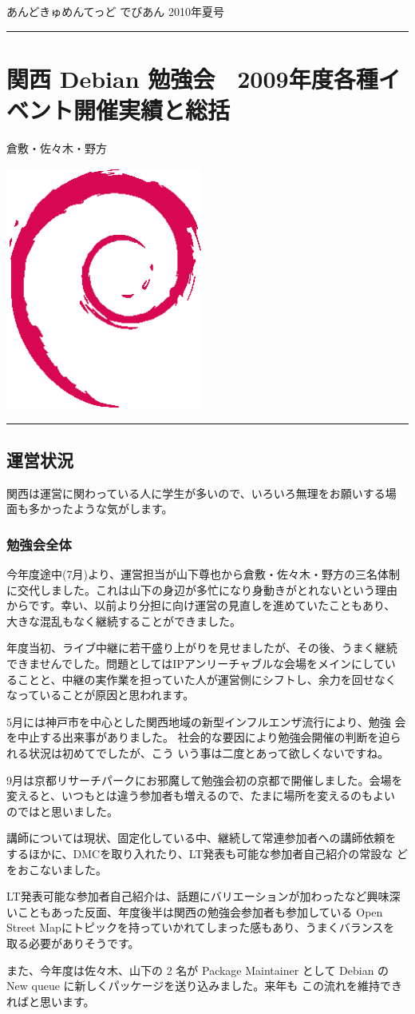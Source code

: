 \documentclass[mingoth,a4paper]{jsarticle}
\renewcommand{\dancersection}[2]{%
\newpage
あんどきゅめんてっど でびあん 2010年夏号
%
\vspace{0.1mm}\\
{\color{dancerlightblue}\rule{\hsize}{2mm}}

%
%
\begin{minipage}[t]{0.6\hsize}
\color{dancerdarkblue}
\vspace{1cm}
\section{#1}
\hfill{}#2\\
\end{minipage}
\begin{minipage}[t]{0.4\hsize}
\vspace{-2cm}
\hfill{}\includegraphics[height=8cm]{image200502/openlogo-nd.eps}\\
\vspace{-5cm}
\end{minipage}
%
%
{\color{dancerdarkblue}\rule{0.74\hsize}{2mm}}
%
\vspace{2cm}
}
\begin{document}
\clearpage

\dancersection{関西 Debian 勉強会　2009年度各種イベント開催実績と総括}{倉敷・佐々木・野方}

\subsection{運営状況}

関西は運営に関わっている人に学生が多いので、いろいろ無理をお願いする場
面も多かったような気がします。

\subsubsection{勉強会全体}

今年度途中(7月)より、運営担当が山下尊也から倉敷・佐々木・野方の三名体制
に交代しました。これは山下の身辺が多忙になり身動きがとれないという理由
からです。幸い、以前より分担に向け運営の見直しを進めていたこともあり、
大きな混乱もなく継続することができました。

年度当初、ライブ中継に若干盛り上がりを見せましたが、その後、うまく継続
できませんでした。問題としてはIPアンリーチャブルな会場をメインにしてい
ることと、中継の実作業を担っていた人が運営側にシフトし、余力を回せなく
なっていることが原因と思われます。

5月には神戸市を中心とした関西地域の新型インフルエンザ流行により、勉強
会を中止する出来事がありました。
社会的な要因により勉強会開催の判断を迫られる状況は初めてでしたが、こう
いう事は二度とあって欲しくないですね。

9月は京都リサーチパークにお邪魔して勉強会初の京都で開催しました。会場を
変えると、いつもとは違う参加者も増えるので、たまに場所を変えるのもよい
のではと思いました。

講師については現状、固定化している中、継続して常連参加者への講師依頼を
するほかに、DMCを取り入れたり、LT発表も可能な参加者自己紹介の常設な
どをおこないました。

LT発表可能な参加者自己紹介は、話題にバリエーションが加わったなど興味深
いこともあった反面、年度後半は関西の勉強会参加者も参加している Open
Street Mapにトピックを持っていかれてしまった感もあり、うまくバランスを
取る必要がありそうです。

また、今年度は佐々木、山下の 2 名が Package Maintainer として
Debian の New queue に新しくパッケージを送り込みました。来年も
この流れを維持できればと思います。
\end{document}
